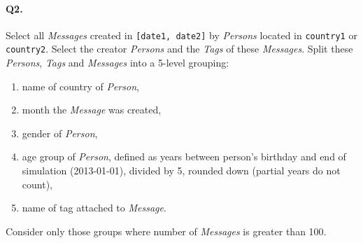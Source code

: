 \paragraph{Q2.}
Select all \emph{Messages} created in \texttt{{[}date1,\ date2{]}} by
\emph{Persons} located in \texttt{country1} or \texttt{country2}. Select
the creator \emph{Persons} and the \emph{Tags} of these \emph{Messages}.
Split these \emph{Persons}, \emph{Tags} and \emph{Messages} into a
5-level grouping:
\begin{enumerate}
\def\labelenumi{\arabic{enumi}.}
\tightlist
\item
  name of country of \emph{Person},
\item
  month the \emph{Message} was created,
\item
  gender of \emph{Person},
\item
  age group of \emph{Person}, defined as years between person's birthday
  and end of simulation (2013-01-01), divided by 5, rounded down
  (partial years do not count),
\item
  name of tag attached to \emph{Message}.
\end{enumerate}
Consider only those groups where number of \emph{Messages} is greater
than 100.
